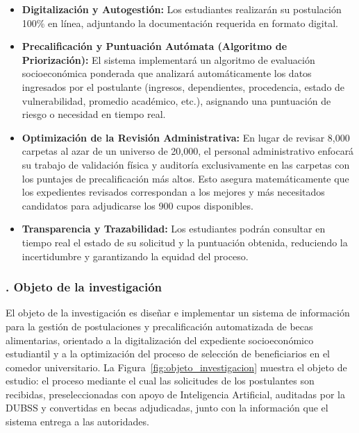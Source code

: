 \begin{itemize}
    \item \textbf{Digitalización y Autogestión:} Los estudiantes realizarán su postulación 100\% en línea, adjuntando la documentación requerida en formato digital.

    \item \textbf{Precalificación y Puntuación Autómata (Algoritmo de Priorización):} El sistema implementará un algoritmo de evaluación socioeconómica ponderada que analizará automáticamente los datos ingresados por el postulante (ingresos, dependientes, procedencia, estado de vulnerabilidad, promedio académico, etc.), asignando una puntuación de riesgo o necesidad en tiempo real.

    \item \textbf{Optimización de la Revisión Administrativa:} En lugar de revisar 8,000 carpetas al azar de un universo de 20,000, el personal administrativo enfocará su trabajo de validación física y auditoría exclusivamente en las carpetas con los puntajes de precalificación más altos. Esto asegura matemáticamente que los expedientes revisados correspondan a los mejores y más necesitados candidatos para adjudicarse los 900 cupos disponibles.

    \item \textbf{Transparencia y Trazabilidad:} Los estudiantes podrán consultar en tiempo real el estado de su solicitud y la puntuación obtenida, reduciendo la incertidumbre y garantizando la equidad del proceso.
\end{itemize}

\subsubsection{. Objeto de la investigación}\label{sec:objeto_investigacion}

El objeto de la investigación es diseñar e implementar un sistema de información para la gestión de postulaciones y precalificación automatizada de becas alimentarias, orientado a la digitalización del expediente socioeconómico estudiantil y a la optimización del proceso de selección de beneficiarios en el comedor universitario. La Figura~\ref{fig:objeto_investigacion} muestra el objeto de estudio: el proceso mediante el cual las solicitudes de los postulantes son recibidas, preseleccionadas con apoyo de Inteligencia Artificial, auditadas por la DUBSS y convertidas en becas adjudicadas, junto con la información que el sistema entrega a las autoridades.


